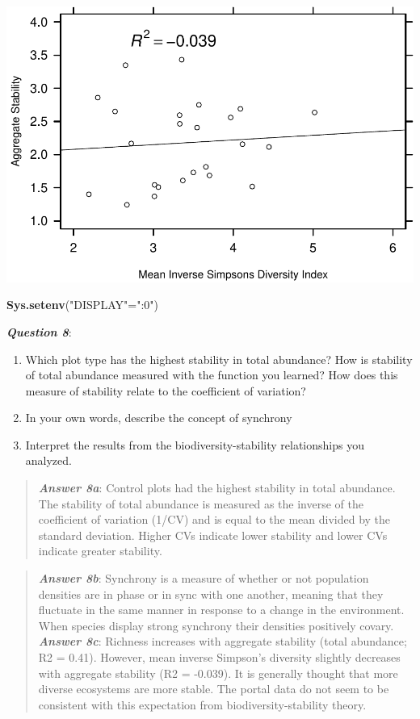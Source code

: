 \documentclass[]{article}
\newenvironment{Shaded}{\begin{snugshade}}{\end{snugshade}}
\newcommand{\KeywordTok}[1]{\textcolor[rgb]{0.13,0.29,0.53}{\textbf{{#1}}}}
\newcommand{\StringTok}[1]{\textcolor[rgb]{0.31,0.60,0.02}{{#1}}}
\newcommand{\NormalTok}[1]{{#1}}
\providecommand{\tightlist}{%
  \setlength{\itemsep}{0pt}\setlength{\parskip}{0pt}}
\begin{document}
\includegraphics{temporal_assignment_files/figure-latex/unnamed-chunk-9-2.pdf}

\begin{Shaded}
\begin{Highlighting}[]
\KeywordTok{Sys.setenv}\NormalTok{(}\StringTok{"DISPLAY"}\NormalTok{=}\StringTok{":0"}\NormalTok{)}
\end{Highlighting}
\end{Shaded}

\textbf{\emph{Question 8}}:

\begin{enumerate}
\def\labelenumi{\alph{enumi}.}
\tightlist
\item
  Which plot type has the highest stability in total abundance? How is
  stability of total abundance measured with the function you learned?
  How does this measure of stability relate to the coefficient of
  variation?
\item
  In your own words, describe the concept of synchrony
\item
  Interpret the results from the biodiversity-stability relationships
  you analyzed.
\end{enumerate}

\begin{quote}
\textbf{\emph{Answer 8a}}: Control plots had the highest stability in
total abundance. The stability of total abundance is measured as the
inverse of the coefficient of variation (1/CV) and is equal to the mean
divided by the standard deviation. Higher CVs indicate lower stability
and lower CVs indicate greater stability.
\end{quote}

\begin{quote}
\textbf{\emph{Answer 8b}}: Synchrony is a measure of whether or not
population densities are in phase or in sync with one another, meaning
that they fluctuate in the same manner in response to a change in the
environment. When species display strong synchrony their densities
positively covary. \textbf{\emph{Answer 8c}}: Richness increases with
aggregate stability (total abundance; R2 = 0.41). However, mean inverse
Simpson's diversity slightly decreases with aggregate stability (R2 =
-0.039). It is generally thought that more diverse ecosystems are more
stable. The portal data do not seem to be consistent with this
expectation from biodiversity-stability theory.
\end{quote}
\end{document}
